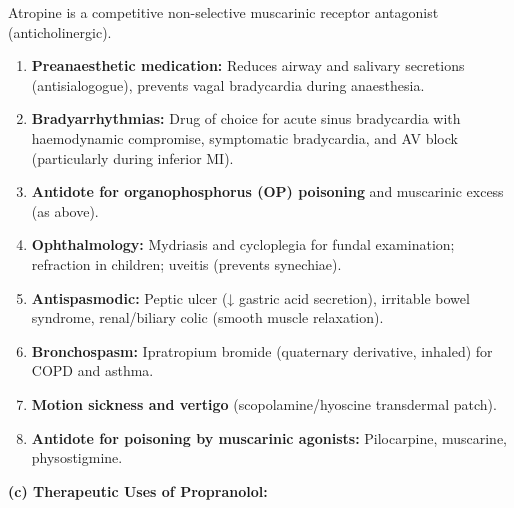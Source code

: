 \documentclass[11pt,a4paper]{article}
\begin{document}
\begin{ansbox}
Atropine is a competitive non-selective muscarinic receptor antagonist (anticholinergic).
\begin{enumerate}[leftmargin=*]
    \item \textbf{Preanaesthetic medication:} Reduces airway and salivary secretions (antisialogogue), prevents vagal bradycardia during anaesthesia.
    \item \textbf{Bradyarrhythmias:} Drug of choice for acute sinus bradycardia with haemodynamic compromise, symptomatic bradycardia, and AV block (particularly during inferior MI).
    \item \textbf{Antidote for organophosphorus (OP) poisoning} and muscarinic excess (as above).
    \item \textbf{Ophthalmology:} Mydriasis and cycloplegia for fundal examination; refraction in children; uveitis (prevents synechiae).
    \item \textbf{Antispasmodic:} Peptic ulcer (↓ gastric acid secretion), irritable bowel syndrome, renal/biliary colic (smooth muscle relaxation).
    \item \textbf{Bronchospasm:} Ipratropium bromide (quaternary derivative, inhaled) for COPD and asthma.
    \item \textbf{Motion sickness and vertigo} (scopolamine/hyoscine transdermal patch).
    \item \textbf{Antidote for poisoning by muscarinic agonists:} Pilocarpine, muscarine, physostigmine.
\end{enumerate}

\textbf{(c) Therapeutic Uses of Propranolol:}


\end{ansbox}
\end{document}
